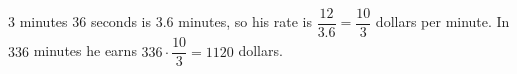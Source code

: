 $3$ minutes $36$ seconds is $3.6$ minutes, so his rate is $\dfrac{12}{3.6}=\dfrac{10}3$ dollars per minute. In $336$ minutes he earns $336\cdot\dfrac{10}3=\boxed{1120}$ dollars.

